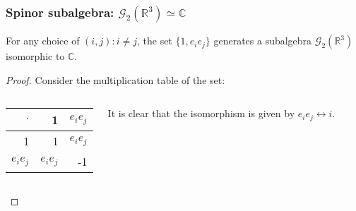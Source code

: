 \documentclass{beamer}
\newcommand{\R}{\mathbb{R}}
\newcommand{\C}{\mathbb{C}}
\newcommand{\G}{\mathcal{G}}
\begin{document}
\begin{frame}
\frametitle{Spinor subalgebra: $\G_2(\R^3) \simeq \C$}
\begin{theorem}
    For any choice of $(i,j) : i\neq j$, the set $\{1, e_ie_j\}$ generates a subalgebra $\G_2(\R^3)$ isomorphic to $\C$.
\end{theorem}
\begin{proof}
    Consider the multiplication table of the set:
    \begin{columns}
        \begin{center}
            \renewcommand\arraystretch{1.3}
            \setlength\doublerulesep{0pt}
            \begin{tabular}{|r|||r|r|}
            \hline
            $\cdot$ & 1 & $e_ie_j$ \\
            \hline\hline\hline
            1 & 1 & $e_ie_j$ \\ 
            \hline
            $e_ie_j$ & $e_ie_j$ & -1\\ 
            \hline
            \end{tabular}
        \end{center}
  
        It is clear that the isomorphism is given by $e_ie_j \longleftrightarrow i$.
    \end{columns}
\end{proof}
\end{frame}
\end{document}
